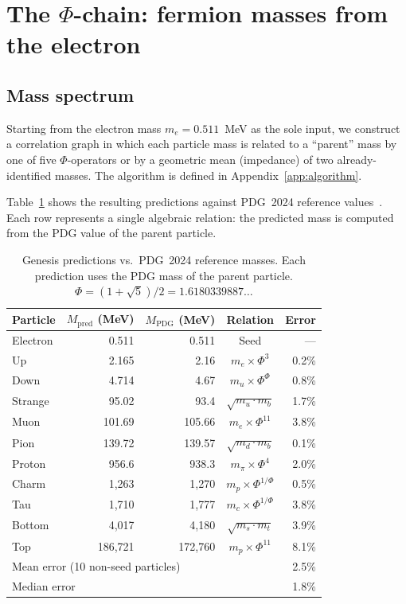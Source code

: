 \documentclass[11pt,a4paper]{article}
\begin{document}
\section{The \texorpdfstring{$\Phi$}{Phi}-chain: fermion masses from the electron}
\label{sec:chain}

\subsection{Mass spectrum}
\label{sec:spectrum}

Starting from the electron mass $m_e = 0.511$~MeV as the sole input,
we construct a correlation graph in which each particle mass is
related to a ``parent'' mass by one of five $\Phi$-operators or by a
geometric mean (impedance) of two already-identified masses. The
algorithm is defined in Appendix~\ref{app:algorithm}.

Table~\ref{tab:genesis} shows the resulting predictions against
PDG~2024 reference values~\cite{PDG2024}. Each row represents a
single algebraic relation: the predicted mass is computed from the
PDG value of the parent particle.

\begin{table}[H]
\centering
\caption{Genesis predictions vs.\ PDG~2024 reference masses.
Each prediction uses the PDG mass of the parent particle.
$\Phi = (1{+}\sqrt{5})/2 = 1.6180339887\ldots$}
\label{tab:genesis}
\begin{tabular}{@{}lrrcr@{}}
\toprule
Particle & $M_\text{pred}$ (MeV) & $M_\text{PDG}$ (MeV) &
  Relation & Error \\
\midrule
Electron & 0.511 & 0.511 & Seed & --- \\
Up       & 2.165  & 2.16  & $m_e \times \Phi^3$          & 0.2\% \\
Down     & 4.714  & 4.67  & $m_u \times \Phi^\Phi$       & 0.8\% \\
Strange  & 95.02  & 93.4  & $\sqrt{m_u \cdot m_b}$       & 1.7\% \\
Muon     & 101.69 & 105.66 & $m_e \times \Phi^{11}$      & 3.8\% \\
Pion     & 139.72 & 139.57 & $\sqrt{m_d \cdot m_b}$      & 0.1\% \\
Proton   & 956.6  & 938.3  & $m_\pi \times \Phi^4$       & 2.0\% \\
Charm    & 1{,}263 & 1{,}270 & $m_p \times \Phi^{1/\Phi}$ & 0.5\% \\
Tau      & 1{,}710 & 1{,}777 & $m_c \times \Phi^{1/\Phi}$ & 3.8\% \\
Bottom   & 4{,}017 & 4{,}180 & $\sqrt{m_s \cdot m_t}$     & 3.9\% \\
Top      & 186{,}721 & 172{,}760 & $m_p \times \Phi^{11}$ & 8.1\% \\
\midrule
\multicolumn{4}{l}{Mean error (10 non-seed particles)} & 2.5\% \\
\multicolumn{4}{l}{Median error} & 1.8\% \\
\bottomrule
\end{tabular}
\end{table}
\end{document}

